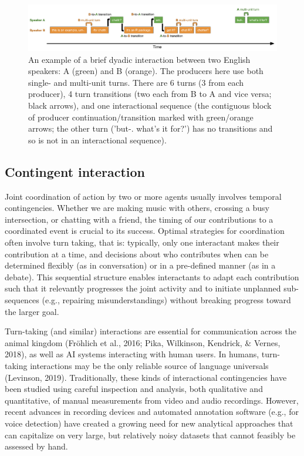 \documentclass[10pt, letterpaper]{article}
\newenvironment{CodeChunk}{}{}
\begin{document}
\begin{CodeChunk}
\begin{figure}[h]

{\centering \includegraphics{figs/minisequence-1} 

}

\caption[An example of a brief dyadic interaction between two English speakers]{An example of a brief dyadic interaction between two English speakers: A (green) and B (orange). The producers here use both single- and multi-unit turns. There are 6 turns (3 from each producer), 4 turn transitions (two each from B to A and vice versa; black arrows), and one interactional sequence (the contiguous block of producer continuation/transition marked with green/orange arrows; the other turn ('but-. what's it for?') has no transitions and so is not in an interactional sequence).}\label{fig:minisequence}
\end{figure}
\end{CodeChunk}

\hypertarget{contingent-interaction}{%
\subsection{Contingent interaction}\label{contingent-interaction}}

Joint coordination of action by two or more agents usually involves
temporal contingencies. Whether we are making music with others,
crossing a busy intersection, or chatting with a friend, the timing of
our contributions to a coordinated event is crucial to its success.
Optimal strategies for coordination often involve turn taking, that is:
typically, only one interactant makes their contribution at a time, and
decisions about who contributes when can be determined flexibly (as in
conversation) or in a pre-defined manner (as in a debate). This
sequential structure enables interactants to adapt each contribution
such that it relevantly progresses the joint activity and to initiate
unplanned sub-sequences (e.g., repairing misunderstandings) without
breaking progress toward the larger goal.

Turn-taking (and similar) interactions are essential for communication
across the animal kingdom (Fröhlich et al., 2016; Pika, Wilkinson,
Kendrick, \& Vernes, 2018), as well as AI systems interacting with human
users. In humans, turn-taking interactions may be the only reliable
source of language universals (Levinson, 2019). Traditionally, these
kinds of interactional contingencies have been studied using careful
inspection and analysis, both qualitative and quantitative, of manual
measurements from video and audio recordings. However, recent advances
in recording devices and automated annotation software (e.g., for voice
detection) have created a growing need for new analytical approaches
that can capitalize on very large, but relatively noisy datasets that
cannot feasibly be assessed by hand.
\end{document}

